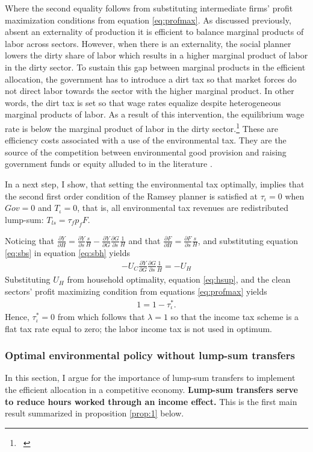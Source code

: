 Where the second equality follows from substituting intermediate firms' profit maximization conditions from equation \ref{eq:profmax}. 
As discussed previously, absent an externality of production it is efficient to balance marginal products of labor across sectors. However, when there is an externality, the social planner lowers the dirty share of labor which results in a higher marginal product of labor in the dirty sector. To sustain this gap between marginal products in the efficient allocation, the government has to introduce a dirt tax so that market forces do not direct labor towards the sector with the higher marginal product. In other words, the dirt tax is set so that wage rates equalize despite heterogeneous marginal products of labor. As a result of this intervention, the equilibrium wage rate is below the marginal product of labor in the dirty sector.\footnote{\ } These are efficiency costs associated with a use of the environmental tax. They are the source of the competition between environmental good provision and raising government funds or equity alluded to in the literature \citep{LansBovenberg1994EnvironmentalTaxation}.  

In a next step, I show, that setting the environmental tax optimally, implies that the second first order condition of the Ramsey planner is satisfied at $\tau_\iota=0$ when $Gov=0$ and $T_\iota=0$, that is, all environmental tax revenues are redistributed lump-sum: $T_{ls}=\tau_{f}p_fF$.

Noticing that $\frac{\partial Y}{\partial H}= \frac{\partial Y}{\partial s}\frac{s}{H}-\frac{\partial Y}{\partial G}\frac{\partial G}{\partial s}\frac{1}{H}$ and that $\frac{\partial F}{\partial H}=\frac{\partial F}{\partial s}\frac{s}{H}$, and substituting equation \ref{eq:sbs} in equation \ref{eq:sbh} yields
\begin{align}
-U_C \frac{\partial Y}{\partial G}\frac{\partial G}{\partial s}\frac{1}{H}=-U_H
\end{align}
Substituting $U_H$ from household optimality, equation \ref{eq:hsup}, and the clean sectors' profit maximizing condition from equations \ref{eq:profmax} yields
\begin{align}
1=1-\tau^*_\iota.
\end{align}
Hence, $\tau^*_\iota =0$ from which follows that $\lambda =1$ so that the income tax scheme is a flat tax rate equal to zero; the labor income tax is not used in optimum.


\subsubsection{Optimal environmental policy without lump-sum transfers}
In this section, I argue for the importance of lump-sum transfers to implement the efficient allocation in a competitive economy. \textbf{Lump-sum transfers serve to reduce hours worked through an income effect. }
This is the first main result summarized in proposition \ref{prop:1} below. 

